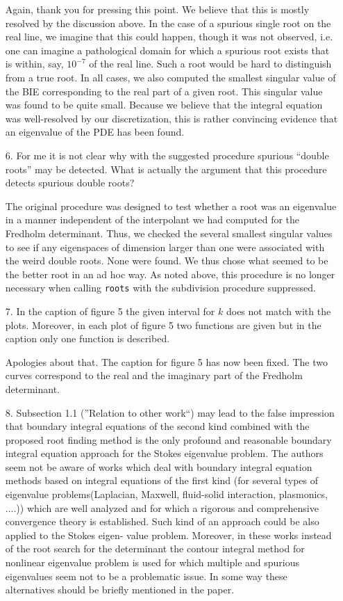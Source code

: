 \documentclass{article}
\begin{document}
\begin{itemize}
Again, thank you for pressing this point. We believe that this
is mostly resolved by the discussion above. In the case of a spurious
single root on the real line, we imagine that this could happen, though it
was not observed, i.e. one can imagine a pathological domain for which a
spurious root exists that is within, say, $10^{-7}$ of the real line.
Such a root would be hard to distinguish from a true root.
In all cases, we also computed the smallest singular
value of the BIE corresponding to the real part of a given root.
This singular value was found to be quite small. Because we believe
that the integral equation was well-resolved
by our discretization, this is rather convincing evidence that an
eigenvalue of the PDE has been found.

\item[6.] {\color{blue}
  For me it is not clear why with the suggested procedure spurious ``double roots''
  may be detected. What is actually the argument that this
  procedure detects spurious double roots?}

The original procedure was designed to test whether a root was
an eigenvalue in a manner independent of the interpolant we had
computed for the Fredholm determinant. Thus, we checked the several smallest
singular values to see if any eigenspaces of dimension larger
than one were associated
with the weird double roots. None were found. We thus chose what
seemed to be the better root in an ad hoc way. As noted above, this
procedure is no longer necessary when calling \texttt{roots} with
the subdivision procedure suppressed.

\item[7.] {\color{blue}In the caption of figure 5 the given interval for $k$
  does not match with the plots. Moreover, in each plot of figure
  5 two functions are given but in the caption only one function is described.}

Apologies about that. The caption for figure 5 has now been fixed. The two curves
correspond to the real and the imaginary part of the Fredholm determinant. 

\item[8.] {\color{blue}Subsection 1.1 (”Relation to other work“) may
  lead to the false impression that boundary integral equations of the
  second kind combined with the proposed root finding method is the only
  profound and reasonable boundary integral equation approach for the Stokes
  eigenvalue problem. The authors seem not be aware of works which deal with
  boundary integral equation methods based on integral equations of the
  first kind (for several types of eigenvalue problems(Laplacian, Maxwell,
  fluid-solid interaction, plasmonics, ....)) which are well analyzed and for
  which a rigorous and comprehensive convergence theory is established.
  Such kind of an approach could be also applied to the Stokes eigen-
  value problem. Moreover, in these works instead of the root search for
  the determinant the contour integral method for nonlinear eigenvalue
  problem is used for which multiple and spurious eigenvalues seem not
  to be a problematic issue. In some way these alternatives should be
  briefly mentioned in the paper.}


\end{itemize}
\end{document}
